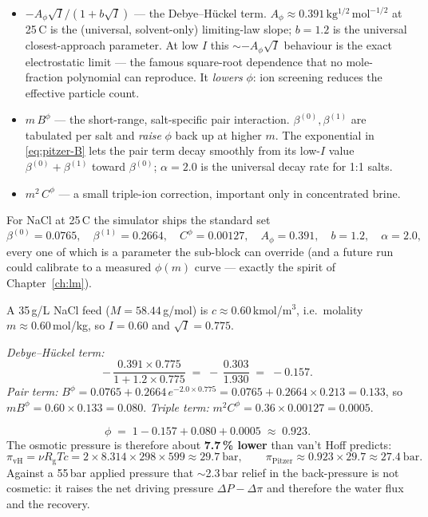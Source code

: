 \documentclass[11pt,a4paper]{article}
\newcommand{\Rgas}{R_{\!\mathrm{g}}}                %
\begin{document}
\begin{itemize}[leftmargin=*,nosep,topsep=2pt]
  \item \textbf{$-A_\phi\sqrt I/(1+b\sqrt I)$} --- the Debye--H\"uckel
        term.  $A_\phi \approx 0.391\,\mathrm{kg^{1/2}\,mol^{-1/2}}$ at
        25\,\textdegree C is the (universal, solvent-only) limiting-law
        slope; $b = 1.2$ is the universal closest-approach parameter.
        At low $I$ this $\sim -A_\phi\sqrt I$ behaviour is the exact
        electrostatic limit --- the famous square-root dependence that
        no mole-fraction polynomial can reproduce.  It \emph{lowers}
        $\phi$: ion screening reduces the effective particle count.
  \item \textbf{$m\,B^{\phi}$} --- the short-range, salt-specific pair
        interaction.  $\beta^{(0)}, \beta^{(1)}$ are tabulated per salt
        and \emph{raise} $\phi$ back up at higher $m$.  The
        exponential in \eqref{eq:pitzer-B} lets the pair term decay
        smoothly from its low-$I$ value $\beta^{(0)}+\beta^{(1)}$
        toward $\beta^{(0)}$; $\alpha = 2.0$ is the universal decay
        rate for 1:1 salts.
  \item \textbf{$m^{2}\,C^{\phi}$} --- a small triple-ion correction,
        important only in concentrated brine.
\end{itemize}

For NaCl at 25\,\textdegree C the simulator ships the standard set
\[
   \beta^{(0)} = 0.0765,\quad
   \beta^{(1)} = 0.2664,\quad
   C^{\phi} = 0.00127,\quad
   A_\phi = 0.391,\quad b = 1.2,\quad \alpha = 2.0,
\]
every one of which is a parameter the  sub-block can
override (and a future  run could calibrate to a
measured $\phi(m)$ curve --- exactly the spirit of
Chapter~\ref{ch:lm}).

\begin{example}
A 35\,g/L NaCl feed ($M = 58.44$\,g/mol) is $c \approx 0.60$\,kmol/m$^3$,
i.e.\ molality $m \approx 0.60$\,mol/kg, so $I = 0.60$ and
$\sqrt I = 0.775$.

\emph{Debye--H\"uckel term:}
\[
   -\,\frac{0.391 \times 0.775}{1 + 1.2 \times 0.775}
   \;=\; -\,\frac{0.303}{1.930}
   \;=\; -0.157.
\]
\emph{Pair term:}
$B^{\phi} = 0.0765 + 0.2664\,e^{-2.0 \times 0.775}
          = 0.0765 + 0.2664 \times 0.213 = 0.133$, so
$m B^{\phi} = 0.60 \times 0.133 = 0.080$.
\emph{Triple term:} $m^2 C^{\phi} = 0.36 \times 0.00127 = 0.0005$.

\[
   \phi \;=\; 1 - 0.157 + 0.080 + 0.0005 \;\approx\; 0.923.
\]
The osmotic pressure is therefore about \textbf{7.7\,\% lower} than
van't Hoff predicts:
\[
   \pi_{\text{vH}} = \nu \Rgas T c
   = 2 \times 8.314 \times 298 \times 599 \approx 29.7~\text{bar},
   \qquad
   \pi_{\text{Pitzer}} \approx 0.923 \times 29.7 \approx 27.4~\text{bar}.
\]
Against a 55\,bar applied pressure that $\sim$2.3\,bar relief in the
back-pressure is not cosmetic: it raises the net driving pressure
$\Delta P - \Delta\pi$ and therefore the water flux and the recovery.
\end{example}
\end{document}
